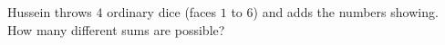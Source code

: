 Hussein throws $4$ ordinary dice (faces $1$ to $6$) and adds the numbers showing. How many different sums are possible?
